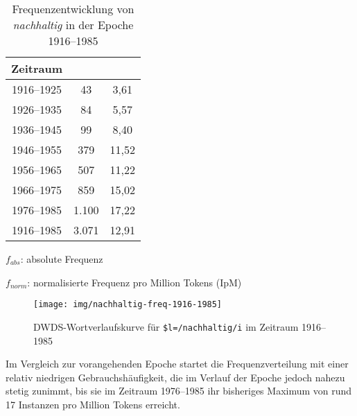 \documentclass[
    german,
    a4paper,%
    12pt,%
    oneside,%
    toc=bibliography,
    final,
]{scrartcl}
\begin{document}
\begin{table}[h!]
	\centering
	\renewcommand{\arraystretch}{1.5}
	
	\caption{Frequenzentwicklung von \textit{nachhaltig} in der Epoche 1916–1985}
	\label{tab:freq-epoche3}
	
	\begin{threeparttable}
	
	\begin{tabular}{ccc}
	\textbf{Zeitraum} & \boldmath{$f_{abs}$} & \boldmath{$f_{norm}$} \\ \hline
	1916–1925 & 43 & 3,61 \\ \hline
	1926–1935 & 84 & 5,57 \\ \hline
	1936–1945 & 99 & 8,40 \\ \hline
	1946–1955 & 379 & 11,52 \\ \hline
	1956–1965 & 507 & 11,22 \\ \hline
	1966–1975 & 859 & 15,02 \\ \hline
	1976–1985 & 1.100 & 17,22 \\ \hline\hline
	1916–1985 & 3.071 & 12,91 \\ \hline
	\end{tabular} 
	
	\begin{tablenotes}
	\footnotesize
	\setlength{\itemindent}{-1.2em}
	\item $f_{abs}$: absolute Frequenz
	\item $f_{norm}$: normalisierte Frequenz pro Million Tokens (IpM)
	\end{tablenotes}
	
	\end{threeparttable}
\end{table}

\begin{figure}[h!]
	\centering
	
	\texttt{[image: img/nachhaltig-freq-1916-1985]}
	\caption[corpus-size]{DWDS-Wortverlaufskurve für \lstinline|$l=/nachhaltig/i| im Zeitraum 1916–1985\protect\footnotemark}
	\label{fig:nachhaltig-freq-1916-1985}
\end{figure}


Im Vergleich zur vorangehenden Epoche startet die Frequenzverteilung mit einer relativ niedrigen Gebrauchshäufigkeit, die im Verlauf der Epoche jedoch nahezu stetig zunimmt, bis sie im Zeitraum 1976–1985 ihr bisheriges Maximum von rund 17 Instanzen pro Million Tokens erreicht.
\end{document}
